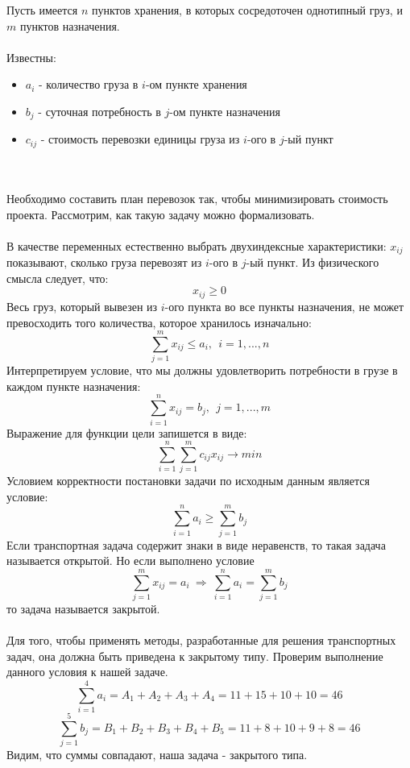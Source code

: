 \documentclass{article}
\begin{document}
\noindent Пусть имеется $n$ пунктов хранения, в которых сосредоточен однотипный груз, и $m$ пунктов назначения.
\\\\
Известны:
\begin{itemize}
    \item $a_i$ - количество груза в $i$-ом пункте хранения
    \item $b_j$ - суточная потребность в $j$-ом пункте назначения
    \item $c_{ij}$ - стоимость перевозки единицы груза из $i$-ого в $j$-ый пункт
\end{itemize}
\\\\
Необходимо составить план перевозок так, чтобы минимизировать стоимость проекта. Рассмотрим, как такую задачу можно формализовать.
\\\\
В качестве переменных естественно выбрать двухиндексные характеристики: $x_{ij}$ показывают, сколько груза перевозят из $i$-ого в $j$-ый пункт. Из физического смысла следует, что: 
$$x_{ij} \ge 0$$
Весь груз, который вывезен из $i$-ого пункта во все пункты назначения, не может превосходить того количества, которое хранилось изначально:
$$\displaystyle\sum_{j=1}^{m} x_{ij} \le a_i ,~~i = 1,...,n$$
Интерпретируем условие, что мы должны удовлетворить потребности в грузе в каждом пункте назначения:
$$\displaystyle\sum_{i=1}^{n} x_{ij} = b_j ,~~j = 1,...,m$$
Выражение для функции цели запишется в виде:
$$\displaystyle\sum_{i=1}^{n}\sum_{j=1}^{m} c_{ij}x_{ij} \longrightarrow min$$
Условием корректности постановки задачи по исходным данным является условие:
$$\displaystyle\sum_{i=1}^{n} a_{i} \ge \displaystyle\sum_{j=1}^{m} b_{j}$$
Если транспортная задача содержит знаки в виде неравенств, то такая задача называется открытой. Но если выполнено условие
$$\displaystyle\sum_{j=1}^{m} x_{ij} = a_i~ \Rightarrow ~  \displaystyle\sum_{i=1}^{n} a_{i} = \displaystyle\sum_{j=1}^{m} b_{j}$$
то задача называется закрытой.
\\\\
Для того, чтобы применять методы, разработанные для решения транспортных задач, она должна быть приведена к закрытому типу. Проверим выполнение данного условия к нашей задаче.
$$\displaystyle\sum_{i=1}^{4} a_{i} = A_1 + A_2 + A_3 + A_4 = 11 + 15 + 10 + 10 = 46$$
$$\displaystyle\sum_{j=1}^{5} b_{j} = B_1 + B_2 + B_3 + B_4 + B_5 = 11 + 8 + 10 + 9 + 8 = 46$$
Видим, что суммы совпадают, наша задача - закрытого типа.
\end{document}
